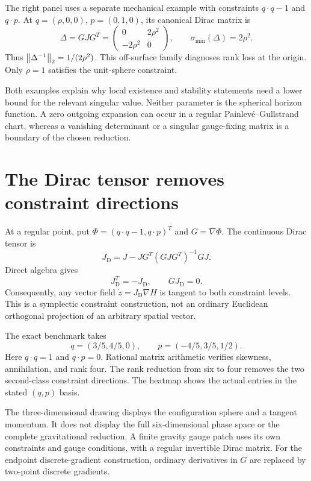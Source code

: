 The right panel uses a separate mechanical example with constraints $q\cdot q-1$ and $q\cdot p$. At $q=(\rho,0,0)$, $p=(0,1,0)$, its canonical Dirac matrix is
\[
\Delta=GJG^T
=\begin{pmatrix}0&2\rho^2\\-2\rho^2&0\end{pmatrix},
\qquad
\sigma_{\min}(\Delta)=2\rho^2.
\]
Thus $\left\lVert\Delta^{-1}\right\rVert_2=1/(2\rho^2)$. This off-surface family diagnoses rank loss at the origin. Only $\rho=1$ satisfies the unit-sphere constraint.

Both examples explain why local existence and stability statements need a lower bound for the relevant singular value. Neither parameter is the spherical horizon function. A zero outgoing expansion can occur in a regular Painlev\'e--Gullstrand chart, whereas a vanishing determinant or a singular gauge-fixing matrix is a boundary of the chosen reduction.



\clearpage
\section{The Dirac tensor removes constraint directions}

At a regular point, put $\Phi=(q\cdot q-1,q\cdot p)^T$ and $G=\nabla\Phi$. The continuous Dirac tensor is
\[
J_{\mathrm D}=J-JG^T(GJG^T)^{-1}GJ.
\]
Direct algebra gives
\[
J_{\mathrm D}^T=-J_{\mathrm D},\qquad GJ_{\mathrm D}=0.
\]
Consequently, any vector field $\dot z=J_{\mathrm D}\nabla H$ is tangent to both constraint levels. This is a symplectic constraint construction, not an ordinary Euclidean orthogonal projection of an arbitrary spatial vector.

The exact benchmark takes
\[
q=(3/5,4/5,0),\qquad p=(-4/5,3/5,1/2).
\]
Here $q\cdot q=1$ and $q\cdot p=0$. Rational matrix arithmetic verifies skewness, annihilation, and rank four. The rank reduction from six to four removes the two second-class constraint directions. The heatmap shows the actual entries in the stated $(q,p)$ basis.

The three-dimensional drawing displays the configuration sphere and a tangent momentum. It does not display the full six-dimensional phase space or the complete gravitational reduction. A finite gravity gauge patch uses its own constraints and gauge conditions, with a regular invertible Dirac matrix. For the endpoint discrete-gradient construction, ordinary derivatives in $G$ are replaced by two-point discrete gradients.



